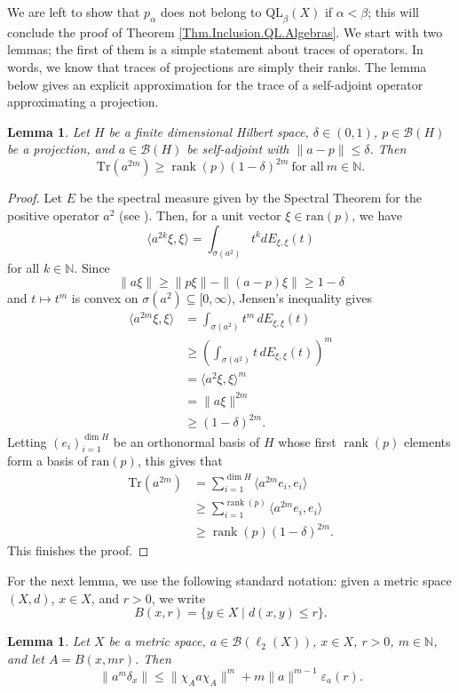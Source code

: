 \documentclass[11pt]{amsart}
\newcommand{\N}{\mathbb{N}}
\newcommand{\B}{\mathcal{B}}
\numberwithin{equation}{section}
\newtheorem{lemma}[theorem]{Lemma}
\theoremstyle{definition}
\theoremstyle{remark}
\DeclareMathOperator{\rank}{rank}
\begin{document}
We are left to show that $p_\alpha$ does not belong to $\mathrm{QL}_\beta(X)$ if $\alpha<\beta$; this will conclude the proof of Theorem \ref{Thm.Inclusion.QL.Algebras}. We start with two lemmas; the first of them is a simple statement about traces of operators. In words, we know that traces of projections are simply their ranks. The lemma below gives an explicit approximation for the trace of a self-adjoint operator approximating  a projection.

\begin{lemma}\label{lem:trace}
Let $H$ be a finite dimensional Hilbert space, $\delta\in (0,1)$, $p\in\B(H)$ be a projection, and $a\in\B(H)$ be self-adjoint with $\|a-p\|\leq \delta$. Then
\[
\mathrm{Tr}(a^{2m})\geq \rank(p)(1-\delta)^{2m}\ \text{for all}\  m\in\N.
\]
\end{lemma}

\begin{proof}
Let $E$ be the spectral measure given by the Spectral Theorem for the positive  operator $a^2$ (see \cite{rudin1991functional}). Then, for a unit vector $\xi\in \mathrm{ran}(p)$, we have
\[\langle a^{2k}\xi,\xi\rangle=\int_{\sigma(a^2)} t^kdE_{\xi,\xi}(t)\] for all $k\in\N$. Since \[\|a\xi\|\geq\|p\xi\|-\|(a-p)\xi\|\geq 1-\delta\] and $t\mapsto t^m$ is convex on $\sigma(a^2)\subseteq [0,\infty)$, Jensen's inequality gives
\begin{align*}
\langle a^{2m}\xi,\xi\rangle&=\int_{\sigma(a^2)} t^m\,dE_{\xi,\xi}(t)\\
&\geq\left(\int_{\sigma(a^2)} t\,dE_{\xi,\xi}(t)\right)^m\\
&=\langle a^2\xi,\xi\rangle^m\\
&=\|a\xi\|^{2m}\\
&\geq(1-\delta)^{2m}.
\end{align*}
Letting $(e_i)_{i=1}^{\dim H}$ be an orthonormal basis of $H$ whose first $\rank(p)$ elements form a basis of $\mathrm{ran}(p)$,  this gives that
\begin{align*}
\mathrm{Tr}(a^{2m})&=\sum_{i=1}^{\dim H}\langle a^{2m}e_i,e_i\rangle\\
&\geq\sum_{i=1}^{\rank(p)}\langle a^{2m}e_i,e_i\rangle\\
&\geq\rank(p)(1-\delta)^{2m}.
\end{align*}
This finishes the proof.\end{proof}

For the next lemma, we use the following standard notation: given a metric space $(X,d)$, $x\in X$, and $r>0$, we write 
\[B(x,r)=\{y\in X\mid d(x,y)\leq r\}.\]
    \begin{lemma}
\label{lem:compression}
Let $X$ be a metric space,   $a\in\B(\ell_2(X))$, $x\in X$, $r>0$, $m\in\N$, and let $A=B(x,m r)$. Then
\[
\|a^m\delta_x\|\leq\|\chi_Aa\chi_A\|^m+m\|a\|^{m-1}\varepsilon_a(r).
\]
    \end{lemma}
\end{document}
